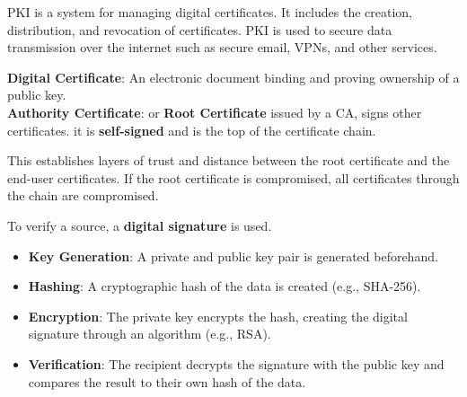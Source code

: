 \newpage 

\begin{Def}

    PKI is a system for managing digital certificates. It includes the creation, distribution, and revocation of certificates.
    PKI is used to secure data transmission over the internet such as secure email, VPNs, and other services.
    \hfill \cite{okta_pki}
\end{Def}

\begin{Def}

    \textbf{Digital Certificate}: An electronic document binding and proving ownership of a public key.\\
    \textbf{Authority Certificate}: or \textbf{Root Certificate} issued by a CA, signs other certificates.
    it is \textbf{self-signed} and is the top of the certificate chain.
    
    This establishes layers of trust and distance between the root certificate and the end-user certificates.
    If the root certificate is compromised, all certificates through the chain are compromised.
    \hfill \cite{yitzhak_digital_certificates}
\end{Def}

\begin{Def}
    
    To verify a source, a \textbf{digital signature} is used. 
    \begin{itemize}
        \item \textbf{Key Generation}: A private and public key pair is generated beforehand.
        \item \textbf{Hashing}: A cryptographic hash of the data is created (e.g., SHA-256).
        \item \textbf{Encryption}: The private key encrypts the hash, creating the digital signature through an algorithm (e.g., RSA).
        \item \textbf{Verification}: The recipient decrypts the signature with the public key and compares the result to their own hash of the data. \hfill \cite{cisa_digital_signatures}
    \end{itemize}
\end{Def}

